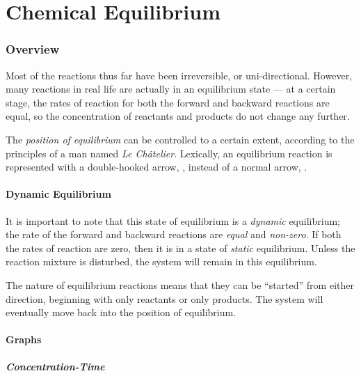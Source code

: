 

\pagebreak
\part{Chemical Equilibrium}

	\section{Overview}

		Most of the reactions thus far have been irreversible, or uni-directional. However, many reactions in real life are actually in an
		equilibrium state --- at a certain stage, the rates of reaction for both the forward and backward reactions are equal, so the
		concentration of reactants and products do not change any further.

		The \textit{position of equilibrium} can be controlled to a certain extent, according to the principles of a man named
		\textit{Le Châtelier}. Lexically, an equilibrium reaction is represented with a double-hooked arrow, \ch{>=<}, instead of a normal
		arrow, \ch{->}.

		\subsection{Dynamic Equilibrium}

			It is important to note that this state of equilibrium is a \textit{dynamic} equilibrium; the rate of the forward and backward
			reactions are \textit{equal} and \textit{non-zero}. If both the rates of reaction are zero, then it is in a state of \textit{static}
			equilibrium. Unless the reaction mixture is disturbed, the system will remain in this equilibrium.

			The nature of equilibrium reactions means that they can be ``started'' from either direction, beginning with only reactants or
			only products. The system will eventually move back into the position of equilibrium.


		\pagebreak
		\subsection{Graphs}

			\subsubsection{Concentration-Time}

